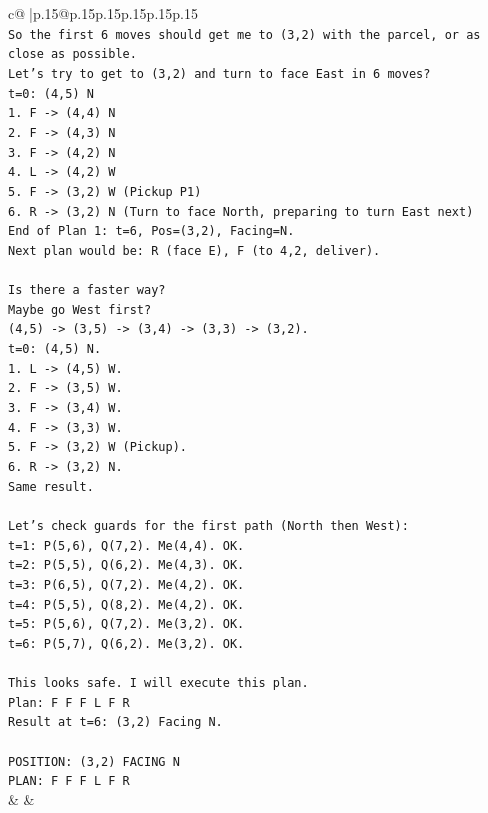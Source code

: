 \documentclass{article}
\begin{document}
{\begin{supertabular}{c@{$\;$}|p{.15\linewidth}@{}p{.15\linewidth}p{.15\linewidth}p{.15\linewidth}p{.15\linewidth}p{.15\linewidth}}
{{{\\ 
\texttt{So the first 6 moves should get me to (3,2) with the parcel, or as close as possible.} \\
\texttt{Let's try to get to (3,2) and turn to face East in 6 moves?} \\
\texttt{t=0: (4,5) N} \\
\texttt{1. F {-}> (4,4) N} \\
\texttt{2. F {-}> (4,3) N} \\
\texttt{3. F {-}> (4,2) N} \\
\texttt{4. L {-}> (4,2) W} \\
\texttt{5. F {-}> (3,2) W (Pickup P1)} \\
\texttt{6. R {-}> (3,2) N (Turn to face North, preparing to turn East next)} \\
\texttt{End of Plan 1: t=6, Pos=(3,2), Facing=N.} \\
\texttt{Next plan would be: R (face E), F (to 4,2, deliver).} \\
\\ 
\texttt{Is there a faster way?} \\
\texttt{Maybe go West first?} \\
\texttt{(4,5) {-}> (3,5) {-}> (3,4) {-}> (3,3) {-}> (3,2).} \\
\texttt{t=0: (4,5) N.} \\
\texttt{1. L {-}> (4,5) W.} \\
\texttt{2. F {-}> (3,5) W.} \\
\texttt{3. F {-}> (3,4) W.} \\
\texttt{4. F {-}> (3,3) W.} \\
\texttt{5. F {-}> (3,2) W (Pickup).} \\
\texttt{6. R {-}> (3,2) N.} \\
\texttt{Same result.} \\
\\ 
\texttt{Let's check guards for the first path (North then West):} \\
\texttt{t=1: P(5,6), Q(7,2). Me(4,4). OK.} \\
\texttt{t=2: P(5,5), Q(6,2). Me(4,3). OK.} \\
\texttt{t=3: P(6,5), Q(7,2). Me(4,2). OK.} \\
\texttt{t=4: P(5,5), Q(8,2). Me(4,2). OK.} \\
\texttt{t=5: P(5,6), Q(7,2). Me(3,2). OK.} \\
\texttt{t=6: P(5,7), Q(6,2). Me(3,2). OK.} \\
\\ 
\texttt{This looks safe. I will execute this plan.} \\
\texttt{Plan: F F F L F R} \\
\texttt{Result at t=6: (3,2) Facing N.} \\
\\ 
\texttt{POSITION: (3,2) FACING N} \\
\texttt{PLAN: F F F L F R} \\
            }
        }
    }
    & & \\ \\


\end{supertabular}}
\end{document}

